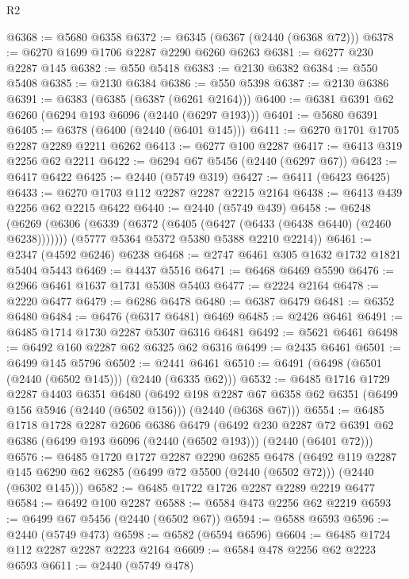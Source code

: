 \begin{lexlean}{R2}
\begin{coremodule}
@6368 := @5680 @6358
@6372 := @6345 (@6367 (@2440 (@6368 @72)))
@6378 := @6270 @1699 @1706 @2287 @2290 @6260 @6263
@6381 := @6277 @230 @2287 @145
@6382 := @550 @5418
@6383 := @2130 @6382
@6384 := @550 @5408
@6385 := @2130 @6384
@6386 := @550 @5398
@6387 := @2130 @6386
@6391 := @6383 (@6385 (@6387 (@6261 @2164)))
@6400 := @6381 @6391 @62 @6260 (@6294 @193 @6096 (@2440 (@6297 @193)))
@6401 := @5680 @6391
@6405 := @6378 (@6400 (@2440 (@6401 @145)))
@6411 := @6270 @1701 @1705 @2287 @2289 @2211 @6262
@6413 := @6277 @100 @2287
@6417 := @6413 @319 @2256 @62 @2211
@6422 := @6294 @67 @5456 (@2440 (@6297 @67))
@6423 := @6417 @6422
@6425 := @2440 (@5749 @319)
@6427 := @6411 (@6423 @6425)
@6433 := @6270 @1703 @112 @2287 @2287 @2215 @2164
@6438 := @6413 @439 @2256 @62 @2215 @6422
@6440 := @2440 (@5749 @439)
@6458 := @6248
    (@6269
      (@6306 (@6339 (@6372 (@6405 (@6427 (@6433 (@6438 @6440) (@2460 @6238)))))))
      (@5777 @5364 @5372 @5380 @5388 @2210 @2214))
@6461 := @2347 (@4592 @6246) @6238
@6468 := @2747 @6461 @305 @1632 @1732 @1821 @5404 @5443
@6469 := @4437 @5516
@6471 := @6468 @6469 @5590
@6476 := @2966 @6461 @1637 @1731 @5308 @5403
@6477 := @2224 @2164
@6478 := @2220 @6477
@6479 := @6286 @6478
@6480 := @6387 @6479
@6481 := @6352 @6480
@6484 := @6476 (@6317 @6481) @6469
@6485 := @2426 @6461
@6491 := @6485 @1714 @1730 @2287 @5307 @6316 @6481
@6492 := @5621 @6461
@6498 := @6492 @160 @2287 @62 @6325 @62 @6316
@6499 := @2435 @6461
@6501 := @6499 @145 @5796
@6502 := @2441 @6461
@6510 := @6491 (@6498 (@6501 (@2440 (@6502 @145))) (@2440 (@6335 @62)))
@6532 := @6485
    @1716
    @1729
    @2287
    @4403
    @6351
    @6480
    (@6492
      @198
      @2287
      @67
      @6358
      @62
      @6351
      (@6499 @156 @5946 (@2440 (@6502 @156)))
      (@2440 (@6368 @67)))
@6554 := @6485
    @1718
    @1728
    @2287
    @2606
    @6386
    @6479
    (@6492
      @230
      @2287
      @72
      @6391
      @62
      @6386
      (@6499 @193 @6096 (@2440 (@6502 @193)))
      (@2440 (@6401 @72)))
@6576 := @6485
    @1720
    @1727
    @2287
    @2290
    @6285
    @6478
    (@6492
      @119
      @2287
      @145
      @6290
      @62
      @6285
      (@6499 @72 @5500 (@2440 (@6502 @72)))
      (@2440 (@6302 @145)))
@6582 := @6485 @1722 @1726 @2287 @2289 @2219 @6477
@6584 := @6492 @100 @2287
@6588 := @6584 @473 @2256 @62 @2219
@6593 := @6499 @67 @5456 (@2440 (@6502 @67))
@6594 := @6588 @6593
@6596 := @2440 (@5749 @473)
@6598 := @6582 (@6594 @6596)
@6604 := @6485 @1724 @112 @2287 @2287 @2223 @2164
@6609 := @6584 @478 @2256 @62 @2223 @6593
@6611 := @2440 (@5749 @478)

\end{coremodule}
\end{lexlean}

